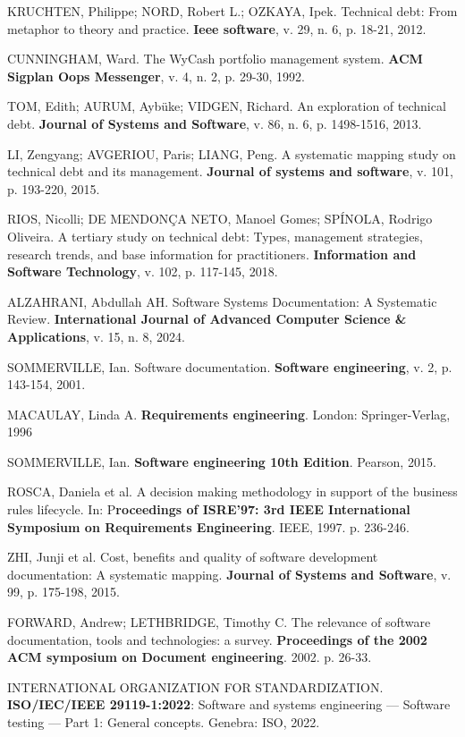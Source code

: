 KRUCHTEN, Philippe; NORD, Robert L.; OZKAYA, Ipek. Technical debt: From metaphor to theory and practice. \textbf{Ieee software}, v. 29, n. 6, p. 18-21, 2012.

CUNNINGHAM, Ward. The WyCash portfolio management system. \textbf{ACM Sigplan Oops Messenger}, v. 4, n. 2, p. 29-30, 1992.

TOM, Edith; AURUM, Aybüke; VIDGEN, Richard. An exploration of technical debt. \textbf{Journal of Systems and Software}, v. 86, n. 6, p. 1498-1516, 2013.

LI, Zengyang; AVGERIOU, Paris; LIANG, Peng. A systematic mapping study on technical debt and its management. \textbf{Journal of systems and software}, v. 101, p. 193-220, 2015.

RIOS, Nicolli; DE MENDONÇA NETO, Manoel Gomes; SPÍNOLA, Rodrigo Oliveira. A tertiary study on technical debt: Types, management strategies, research trends, and base information for practitioners. \textbf{Information and Software Technology}, v. 102, p. 117-145, 2018.

ALZAHRANI, Abdullah AH. Software Systems Documentation: A Systematic Review. \textbf{International Journal of Advanced Computer Science \& Applications}, v. 15, n. 8, 2024.

SOMMERVILLE, Ian. Software documentation. \textbf{Software engineering}, v. 2, p. 143-154, 2001.

MACAULAY, Linda A. \textbf{Requirements engineering}. London: Springer-Verlag, 1996

SOMMERVILLE, Ian. \textbf{Software engineering 10th Edition}. Pearson, 2015.

ROSCA, Daniela et al. A decision making methodology in support of the business rules lifecycle. In: P\textbf{roceedings of ISRE'97: 3rd IEEE International Symposium on Requirements Engineering}. IEEE, 1997. p. 236-246.

ZHI, Junji et al. Cost, benefits and quality of software development documentation: A systematic mapping. \textbf{Journal of Systems and Software}, v. 99, p. 175-198, 2015.

FORWARD, Andrew; LETHBRIDGE, Timothy C. The relevance of software documentation, tools and technologies: a survey. \textbf{Proceedings of the 2002 ACM symposium on Document engineering}. 2002. p. 26-33.

INTERNATIONAL ORGANIZATION FOR STANDARDIZATION. \textbf{ISO/IEC/IEEE 29119-1:2022}: Software and systems engineering — Software testing — Part 1: General concepts. Genebra: ISO, 2022.


